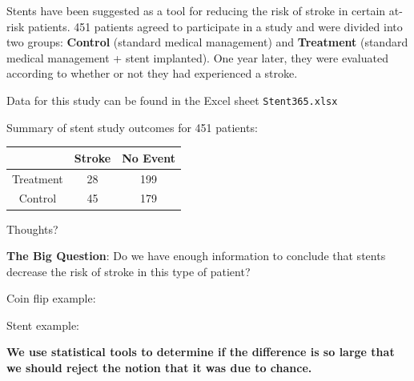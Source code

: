 \documentclass[11pt,letterpaper,twoside]{article}
\begin{document}
Stents have been suggested as a tool for reducing the risk of stroke in certain at-risk patients.  451 patients agreed to participate in a study and were divided into two groups: {\bf Control} (standard medical management) and {\bf Treatment} (standard medical management + stent implanted). One year later, they were evaluated according to whether or not they had experienced a stroke. \vspace{12pt}  

Data for this study can be found in the Excel sheet {\tt Stent365.xlsx }

\newpage

Summary of stent study outcomes for 451 patients:

\bgroup
\def\arraystretch{1.5}
\begin{center}
\begin{tabular}{c || c | c}
& Stroke & No Event \\ \hline
Treatment & 28 & 199 \\
Control & 45 & 179
\end{tabular}
\end{center}
\egroup

Thoughts? \vspace{150pt}

{\bf The Big Question}: Do we have enough information to conclude that stents decrease the risk of stroke in this type of patient? \vspace{10pt}

Coin flip example: \vspace{120pt}

Stent example: \vspace{120pt}

{\bf We use statistical tools to determine if the difference is so large that we should reject the notion that it was due to chance.}


\label{totalpag}
\end{document}
